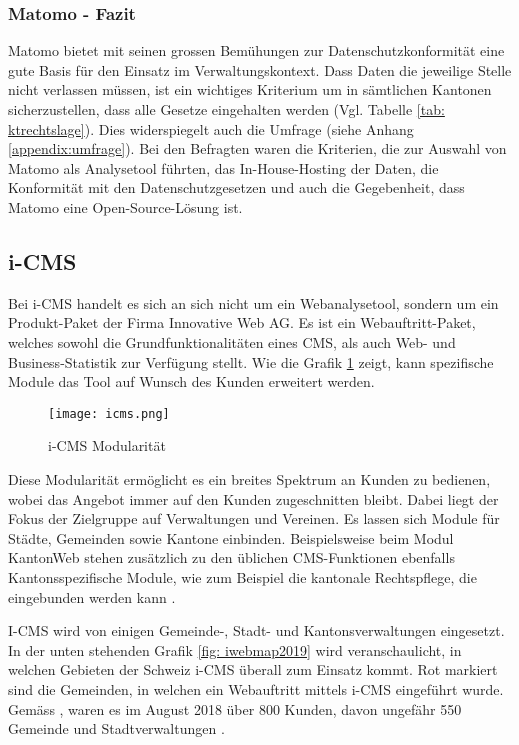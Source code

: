 \subsubsection{Matomo - Fazit}

Matomo bietet mit seinen grossen Bemühungen zur Datenschutzkonformität eine gute Basis für den Einsatz im Verwaltungskontext. Dass Daten die jeweilige Stelle nicht verlassen müssen, ist ein wichtiges Kriterium um in sämtlichen Kantonen sicherzustellen, dass alle Gesetze eingehalten werden (Vgl. Tabelle \ref{tab: ktrechtslage}). Dies widerspiegelt auch die Umfrage (siehe Anhang \ref{appendix:umfrage}). Bei den Befragten waren die Kriterien, die zur Auswahl von Matomo als Analysetool führten, das In-House-Hosting der Daten, die Konformität mit den Datenschutzgesetzen und auch die Gegebenheit, dass Matomo eine Open-Source-Lösung ist.  

\subsection{i-CMS}
Bei i-CMS handelt es sich an sich nicht um ein Webanalysetool, sondern um ein Produkt-Paket der Firma Innovative Web AG. Es ist ein Webauftritt-Paket, welches sowohl die Grundfunktionalitäten eines CMS, als auch Web- und Business-Statistik zur Verfügung stellt\parencite{iwebwebsiteCMS}. Wie die Grafik \ref{fig: icms} zeigt, kann spezifische Module das Tool auf Wunsch des Kunden erweitert werden.


\begin{figure}[h]
  \centering
  \texttt{[image: icms.png]}
  \caption{i-CMS Modularität \parencite{iweb2019revue}}
  \label{fig: icms}
\end{figure}

Diese Modularität ermöglicht es ein breites Spektrum an Kunden zu bedienen, wobei das Angebot immer auf den Kunden zugeschnitten bleibt. Dabei liegt der Fokus der Zielgruppe auf Verwaltungen und Vereinen. Es lassen sich Module für Städte, Gemeinden sowie Kantone einbinden. Beispielsweise beim Modul KantonWeb stehen zusätzlich zu den üblichen CMS-Funktionen ebenfalls Kantonsspezifische Module, wie zum Beispiel die kantonale Rechtspflege, die eingebunden werden kann \parencite{iwebwebsiteKanotonWeb}.

I-CMS wird von einigen Gemeinde-, Stadt- und Kantonsverwaltungen eingesetzt. In der unten stehenden Grafik \ref{fig: iwebmap2019} wird veranschaulicht, in welchen Gebieten der Schweiz i-CMS überall zum Einsatz kommt. Rot markiert sind die Gemeinden, in welchen ein Webauftritt mittels i-CMS eingeführt wurde. Gemäss \parencite[S. 14]{iweb2018revue}, waren es im August 2018 über 800 Kunden, davon ungefähr 550 Gemeinde und Stadtverwaltungen \parencite{iwebwebsiteGemeindeWeb}.

